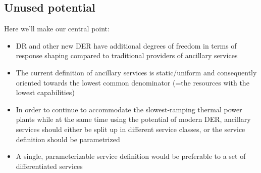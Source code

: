 \subsection{Unused potential}
\label{subsec:unused}

Here we'll make our central point:
\begin{itemize}
\item DR and other new DER have additional degrees of freedom in terms of response shaping compared to traditional providers of ancillary services
\item The current definition of ancillary services is static/uniform and consequently oriented towards the lowest common denominator (=the resources with the lowest capabilities)
\item In order to continue to accommodate the slowest-ramping thermal power plants while at the same time using the potential of modern DER, ancillary services should either be split up in different service classes, or the service definition should be parametrized
\item A single, parameterizable service definition would be preferable to a set of differentiated services 
\end{itemize}